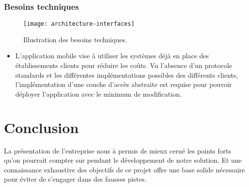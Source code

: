 \subsubsection{Besoins techniques}

\begin{figure}
\center
\texttt{[image: architecture-interfaces]}
\caption{Illustration des besoins techniques.}
\end{figure}

\begin{itemize}

\item L’application mobile vise à utiliser les systèmes déjà en place des
établissements clients pour réduire les coûts. Vu l’absence d'un protocole
standards et les différentes implémentations possibles des différents clients,
l'implémentation d'une couche d’accès abstraite est requise pour pouvoir
déployer l’application avec le minimum de modification.

\end{itemize}

\section{Conclusion} 

La présentation de l'entreprise nous à permis de mieux cerné les points
forts qu'on pourrait compter sur pendant le développement de notre
solution. Et une connaissance exhaustive des objectifs de ce projet
offre une base solide nécessaire pour éviter de s’engager dans des
fausses pistes.
